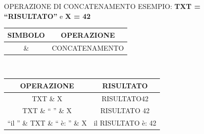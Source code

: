 \documentclass[aspectratio=1610, handout]{beamer}
\begin{document}
\begin{frame}{OPERAZIONE DI CONCATENAMENTO}
    \centering
    ESEMPIO: \textbf{TXT = ``RISULTATO''} e \textbf{X = 42} \\
    \bigskip
    \begin{tabular}{c|c}
        \pause
        \textbf{SIMBOLO} & \textbf{OPERAZIONE} \\
        \hline
        \hline
        \pause
        \& & CONCATENAMENTO \\
        \hline
    \end{tabular} \\
    \bigskip
    \begin{tabular}{c|c}
        \pause
        \textbf{OPERAZIONE} & \textbf{RISULTATO} \\
        \hline
        \hline
        \pause
        TXT \& X & RISULTATO42 \\
        \hline
        \pause
        TXT \& `` '' \& X & RISULTATO 42 \\
        \hline
        \pause
        ``il '' \& TXT \& `` è: '' \& X & il RISULTATO è: 42 \\
        \hline
    \end{tabular}
\end{frame}
\end{document}
